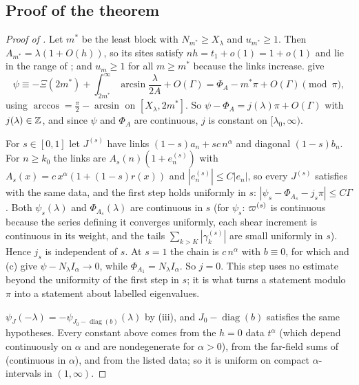 \subsection{Proof of the theorem}

\begin{proof}[Proof of ]
 Let $m^*$ be the least block with $N_{m^*}\ge X_\lambda$ and $u_{m^*}\ge1$.
Then $A_{m^*}=\lambda(1+O(h))$, so its sites satisfy $nh=t_1+o(1)=1+o(1)$ and lie in the range
of ; and $u_m\ge1$ for all $m\ge m^*$ because the links increase.  give
\[
  \psi\equiv-\Xi(2m^*)+\int_{2m^*}^\infty\arcsin\frac{\lambda}{2A}+O(\Gamma)
  =\Phi_A-m^*\pi+O(\Gamma)\pmod\pi,
\]
using $\arccos=\frac\pi2-\arcsin$ on $[X_\lambda,2m^*]$. So $\psi-\Phi_A=j(\lambda)\pi+O(\Gamma)$ with
$j(\lambda)\in\mathbb{Z}$, and since $\psi$ and $\Phi_A$ are continuous, $j$ is constant on
$[\lambda_0,\infty)$.

 For $s\in[0,1]$ let $J^{(s)}$ have links $(1-s)a_n+sc\,n^\alpha$ and
diagonal $(1-s)b_n$. For $n\ge k_0$ the links are $A_s(n)(1+e^{(s)}_n)$ with
$A_s(x)=c\,x^\alpha(1+(1-s)r(x))$ and $|e^{(s)}_n|\le C|e_n|$, so every $J^{(s)}$ satisfies
 with the same data, and the first step holds uniformly in $s$:
$|\psi_s-\Phi_{A_s}-j_s\pi|\le C\Gamma$. Both $\psi_s(\lambda)$ and $\Phi_{A_s}(\lambda)$ are continuous
in $s$ (for $\psi_s$: $\varpi^{(s)}$ is continuous because the series defining it converges
uniformly, each shear increment is continuous in its weight, and the tails
$\sum_{k>K}|\gamma^{(s)}_k|$ are small uniformly in $s$). Hence $j_s$ is independent of $s$. At
$s=1$ the chain is $c\,n^\alpha$ with $b\equiv0$, for which  and
(c) give $\psi-N_\lambda I_\alpha\to0$, while $\Phi_{A_1}=N_\lambda I_\alpha$. So $j=0$. This
step uses no estimate beyond the uniformity of the first step in $s$; it is what turns a statement
modulo $\pi$ into a statement about labelled eigenvalues.

 $\psi_J(-\lambda)=-\psi_{J_0-\operatorname{diag}(b)}(\lambda)$ by
(iii), and $J_0-\operatorname{diag}(b)$ satisfies the same hypotheses. Every constant above comes
from the $h=0$ data $t^\alpha$ (which depend continuously on $\alpha$ and are nondegenerate for
$\alpha>0$), from the far-field sums of  (continuous in $\alpha$), and from the
listed data; so it is uniform on compact $\alpha$-intervals in $(1,\infty)$.
\end{proof}

